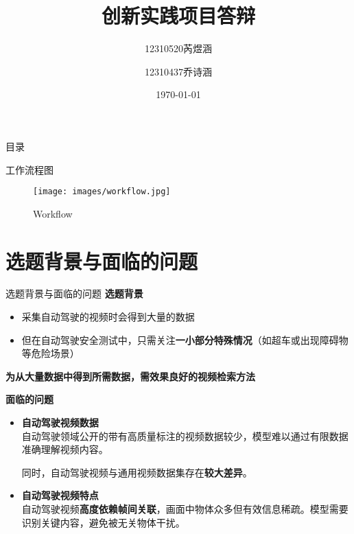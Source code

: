 \documentclass[serif]{beamer}
\title{创新实践项目答辩}
\author{12310520芮煜涵 \and 12310437乔诗涵}
\institute{南方科技大学  \and 计算机科学与工程系}
\date{\today}
\begin{document}
\begin{frame}
  \titlepage
\end{frame}

\begin{frame}{目录}
  \tableofcontents
\end{frame}



\begin{frame}{工作流程图}
   \begin{figure}
        \centering
        \texttt{[image: images/workflow.jpg]}
        \caption{Workflow}
        \label{fig:enter-label}
    \end{figure} 
\end{frame}
\section{选题背景与面临的问题}

\begin{frame}{选题背景与面临的问题}
\vspace{-0.4em}
\textbf{选题背景}

\begin{itemize}
\item 采集自动驾驶的视频时会得到大量的数据
\item 但在自动驾驶安全测试中，只需关注\textbf{一小部分特殊情况}（如超车或出现障碍物等危险场景）
\end{itemize}

\textbf{为从大量数据中得到所需数据，需效果良好的视频检索方法}

\vspace{0.4em}

\textbf{面临的问题}
\begin{itemize}
    \item \textbf{自动驾驶视频数据} \\
          自动驾驶领域公开的带有高质量标注的视频数据较少，模型难以通过有限数据准确理解视频内容。
          
          同时，自动驾驶视频与通用视频数据集存在\textbf{较大差异}。
    \item \textbf{自动驾驶视频特点} \\
          自动驾驶视频\textbf{高度依赖帧间关联}，画面中物体众多但有效信息稀疏。模型需要识别关键内容，避免被无关物体干扰。
\end{itemize}


\end{frame}
\end{document}
